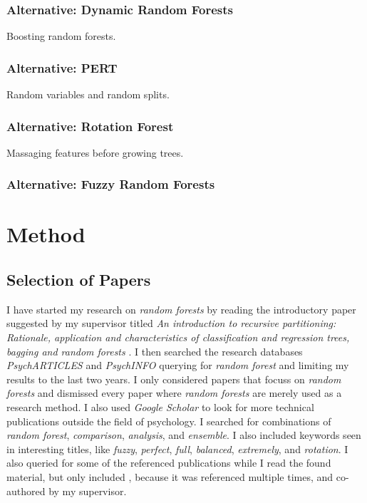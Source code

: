 \documentclass[a4paper,man,12pt,apacite]{apa6} %
\begin{document}
\subsubsection{Alternative: Dynamic Random Forests}
Boosting random forests.

\subsubsection{Alternative: PERT}
Random variables and random splits.

\subsubsection{Alternative: Rotation Forest}
Massaging features before growing trees.

\subsubsection{Alternative: Fuzzy Random Forests}

\section{Method}

\subsection{Selection of Papers}
I have started my research on \emph{random forests} by reading the
introductory paper suggested by my supervisor titled
\emph{An introduction to recursive partitioning: Rationale, application
and characteristics of classification and regression trees, bagging and
random forests} \cite{strobl2009introduction}.
I then searched the research databases \emph{PsychARTICLES} and
\emph{PsychINFO} querying for \emph{random forest} and limiting my results
to the last two years.
I only considered papers that focuss on \emph{random forests} and
dismissed every paper where \emph{random forests} are merely used as a
research method.
I also used \emph{Google Scholar} to look for more technical
publications outside the field of psychology.
I searched for combinations of \emph{random forest}, \emph{comparison},
\emph{analysis}, and \emph{ensemble}.
I also included keywords seen in interesting titles, like \emph{fuzzy},
\emph{perfect}, \emph{full}, \emph{balanced}, \emph{extremely}, and
\emph{rotation}.
I also queried for some of the referenced publications while I read the
found material, but only included \cite{strobl2008conditional}, because
it was referenced multiple times, and co-authored by my supervisor.
\end{document}
